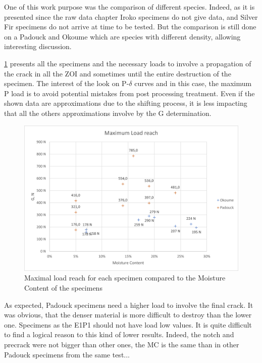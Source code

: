 One of this work purpose was the comparison of different species. Indeed, as it is presented since the raw data chapter Iroko specimens do not give data, and Silver Fir specimens do not arrive at time to be tested. But the comparison is still done on a Padouck and Okoume which are species with different density, allowing interesting discussion. 

\ref{fig:Res_Pmax} presents all the specimens and the necessary loads to involve a propagation of the crack in all the ZOI and sometimes until the entire destruction of the specimen. The interest of the look on P-$\delta$ curves and in this case, the maximum P load is to avoid potential mistakes from post processing treatment. Even if the shown data are approximations due to the shifting process, it is less impacting that all the others approximations involve by the G determination.

\begin{figure}[th]
	\centering
	\includegraphics[width=\textwidth]{Figures/Res_Pmax}
	\decoRule
	\caption[Maximal load reach for each specimen]{Maximal load reach for each specimen compared to the Moisture Content of the specimens}
	\label{fig:Res_Pmax}
\end{figure}

As expected, Padouck specimens need a higher load to involve the final crack. It was obvious, that the denser material is more difficult to destroy than the lower one. Specimens as the E1P1 should not have load low values. It is quite difficult to find a logical reason to this kind of lower results. Indeed, the notch and precrack were not bigger than other ones, the MC is the same than in other Padouck specimens from the same test... 

